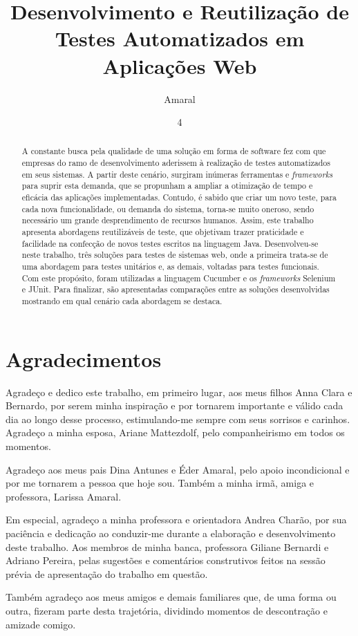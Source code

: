 \documentclass[tg]{mdtufsm}
\title{Desenvolvimento e Reutilização de Testes Automatizados em Aplicações Web}
\author{Amaral}{Lucas Antunes}
\institute{Centro de Tecnologia}
\date{4}{Dezembro}{2015}
\begin{document}
\maketitle


\chapter*{Agradecimentos}
Agradeço e dedico este trabalho, em primeiro lugar, aos meus filhos Anna Clara e Bernardo, por serem minha inspiração e por tornarem importante e válido cada dia ao longo desse processo, estimulando-me sempre com seus sorrisos e carinhos. Agradeço a minha esposa, Ariane Mattezdolf, pelo companheirismo em todos os momentos. 

Agradeço aos meus pais Dina Antunes e Éder Amaral, pelo apoio incondicional e por me tornarem a pessoa que hoje sou. Também a minha irmã, amiga e professora, Larissa Amaral.

Em especial, agradeço a minha professora e orientadora Andrea Charão, por sua paciência e dedicação ao conduzir-me durante a elaboração e desenvolvimento deste trabalho. Aos membros de minha banca, professora Giliane Bernardi e Adriano Pereira, pelas sugestões e comentários construtivos feitos na sessão prévia de apresentação do trabalho em questão.  

Também agradeço aos meus amigos e demais familiares que, de uma forma ou outra, fizeram parte desta trajetória, dividindo momentos de descontração e amizade comigo.
\begin{abstract}
A constante busca pela qualidade de uma solução em forma de software fez com que empresas do ramo de desenvolvimento aderissem à realização de testes automatizados em seus sistemas. A partir deste cenário, surgiram inúmeras ferramentas e \emph{frameworks} para suprir esta demanda, que se propunham a ampliar a otimização de tempo e eficácia das aplicações implementadas. Contudo, é sabido que criar um novo teste, para cada nova funcionalidade, ou demanda do sistema, torna-se muito oneroso, sendo necessário um grande desprendimento de recursos humanos. Assim, este trabalho apresenta abordagens reutilizáveis de teste, que objetivam trazer praticidade e facilidade na confecção de novos testes escritos na linguagem Java. Desenvolveu-se neste trabalho, três soluções para testes de sistemas web, onde a primeira trata-se de uma abordagem para testes unitários e, as demais, voltadas para testes funcionais. Com este propósito, foram utilizadas a linguagem Cucumber e os \emph{frameworks} Selenium e JUnit. Para finalizar, são apresentadas comparações entre as soluções desenvolvidas mostrando em qual cenário cada abordagem se destaca.

\end{abstract}
\end{document}
